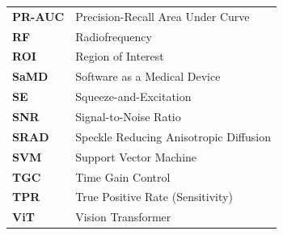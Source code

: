 \begin{table}[htbp]
\begin{tabular}{@{}ll@{}}
\textbf{PR-AUC} & Precision-Recall Area Under Curve \\
\textbf{RF} & Radiofrequency \\
\textbf{ROI} & Region of Interest \\
\textbf{SaMD} & Software as a Medical Device \\
\textbf{SE} & Squeeze-and-Excitation \\
\textbf{SNR} & Signal-to-Noise Ratio \\
\textbf{SRAD} & Speckle Reducing Anisotropic Diffusion \\
\textbf{SVM} & Support Vector Machine \\
\textbf{TGC} & Time Gain Control \\
\textbf{TPR} & True Positive Rate (Sensitivity) \\
\textbf{ViT} & Vision Transformer \\
\end{tabular}
\end{table}
